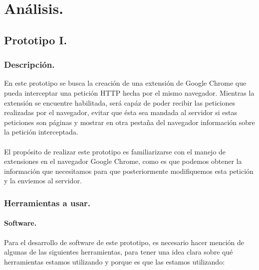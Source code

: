 \documentclass[12pt, a4paper, titlepage]{article}
\begin{document}
	\newpage
	
	\section{\textcolor{azulescom}{Análisis.}}
		\subsection{Prototipo I.}
			\subsubsection{Descripción.}
				En este prototipo se busca la creación de una extensión de Google Chrome que pueda interceptar una petición HTTP hecha por el mismo navegador. Mientras la extensión se encuentre habilitada, será capáz de poder recibir las peticiones realizadas por el navegador, evitar que ésta sea mandada al servidor si estas peticiones son páginas y mostrar en otra pestaña del navegador información sobre la petición interceptada. \\\\
				El propósito de realizar este prototipo es familiarizarse con el manejo de extensiones en el navegador Google Chrome, como es que podemos obtener la información que necesitamos para que posteriormente modifiquemos esta petición y la enviemos al servidor. 
			
			\subsubsection{Herramientas a usar.}
				\paragraph{Software. \\}
				Para el desarrollo de software de este prototipo, es necesario hacer mención de algunas de las siguientes herramientas, para tener una idea clara sobre qué herramientas estamos utilizando y porque es que las estamos utilizando:
				
\end{document}
